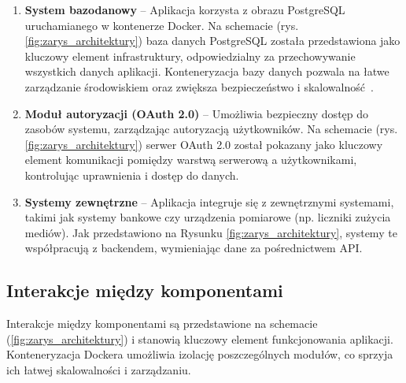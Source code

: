 \begin{enumerate}[label=\arabic*.]
	\item \textbf{System bazodanowy} – Aplikacja korzysta z obrazu PostgreSQL uruchamianego w kontenerze Docker. Na schemacie (rys. \ref{fig:zarys_architektury}) baza danych PostgreSQL została przedstawiona jako kluczowy element infrastruktury, odpowiedzialny za przechowywanie wszystkich danych aplikacji. Konteneryzacja bazy danych pozwala na łatwe zarządzanie środowiskiem oraz zwiększa bezpieczeństwo i skalowalność~\cite{Docker-docs,vsupalov}.

	\item \textbf{Moduł autoryzacji (OAuth 2.0)} – Umożliwia bezpieczny dostęp do zasobów systemu, zarządzając autoryzacją użytkowników. Na schemacie (rys. \ref{fig:zarys_architektury}) serwer OAuth 2.0 został pokazany jako kluczowy element komunikacji pomiędzy warstwą serwerową a użytkownikami, kontrolując uprawnienia i dostęp do danych.

	\item \textbf{Systemy zewnętrzne} – Aplikacja integruje się z zewnętrznymi systemami, takimi jak systemy bankowe czy urządzenia pomiarowe (np. liczniki zużycia mediów). Jak przedstawiono na Rysunku \ref{fig:zarys_architektury}, systemy te współpracują z backendem, wymieniając dane za pośrednictwem API.

	
\end{enumerate}

\subsection{Interakcje między komponentami}

Interakcje między komponentami są przedstawione na schemacie (\ref{fig:zarys_architektury}) i stanowią kluczowy element funkcjonowania aplikacji. Konteneryzacja Dockera umożliwia izolację poszczególnych modułów, co sprzyja ich łatwej skalowalności i zarządzaniu.

